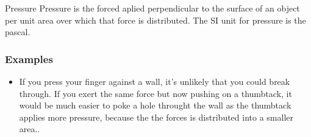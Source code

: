 \documentclass[preview]{standalone}
\begin{document}
\begin{defn*}{Pressure}
  Pressure is the forced aplied perpendicular to the surface of an object per unit area over which that force is distributed. The SI unit for pressure is the pascal.

  \subsubsection*{Examples}
  \begin{itemize}
    \item If you press your finger against a wall, it's unlikely that you could break through. If you exert the same force but now pushing on a thumbtack, it would be much easier to poke a hole throught the wall as the thumbtack applies more pressure, because the the forces is distributed into a smaller area..
  \end{itemize}
  
\end{defn*}
\end{document}
